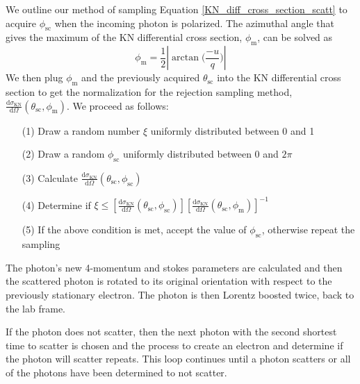 \documentclass[12pt,a4paper]{article}
\begin{document}
We outline our method of sampling Equation \ref{KN_diff_cross_section_scatt} to acquire $\phi_{\mathrm{sc}}$ when the incoming photon is polarized. The azimuthal angle that gives the maximum of the KN differential cross section, $\phi_{\mathrm{m}}$, can be solved as
\begin{equation}
\phi_{\mathrm{m}}=\frac{1}{2} | \arctan \big( \frac{-u}{q} \big) |
\end{equation}
We then plug $\phi_{\mathrm{m}}$ and the previously acquired $\theta_{\mathrm{sc}}$ into the KN differential cross section to get the normalization for the rejection sampling method, $\frac{\mathrm{d} \sigma_{\mathrm{KN}}}{\mathrm{d} \Omega} (\theta_{\mathrm{sc}}, \phi_{\mathrm{m}})$. We proceed as follows:
\begin{itemize}
\item[(1)] Draw a random number $\xi$ uniformly distributed between 0 and 1
\item[(2)] Draw a random $\phi_{\mathrm{sc}}$ uniformly distributed between 0 and $2\pi$
\item[(3)] Calculate $\frac{\mathrm{d} \sigma_{\mathrm{KN}}}{\mathrm{d} \Omega} (\theta_{\mathrm{sc}}, \phi_{\mathrm{sc}})$
\item[(4)] Determine if $\xi \le  [\frac{\mathrm{d} \sigma_{\mathrm{KN}}}{\mathrm{d} \Omega} (\theta_{\mathrm{sc}}, \phi_{\mathrm{sc}})][\frac{\mathrm{d} \sigma_{\mathrm{KN}}}{\mathrm{d} \Omega} (\theta_{\mathrm{sc}}, \phi_{\mathrm{m}})]^{-1}$
\item[(5)] If the above condition is met, accept the value of $\phi_{\mathrm{sc}}$, otherwise repeat the sampling
\end{itemize}  

The photon's new 4-momentum and stokes parameters are calculated and then the scattered photon is rotated to its original orientation with respect to the previously stationary electron. The photon is then Lorentz boosted twice, back to the lab frame. 

If the photon does not scatter, then the next photon with the second shortest time to scatter is chosen and the process to create an electron and determine if the photon will scatter repeats. This loop continues until a photon scatters or all of the photons have been determined to not scatter.
\end{document}
